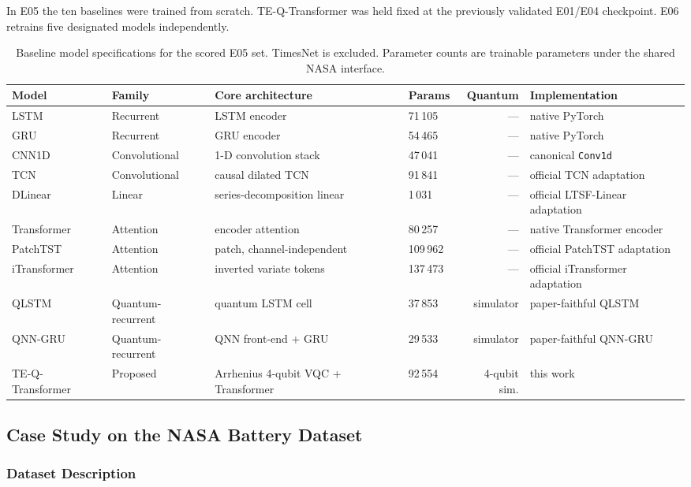 In E05 the ten baselines were trained from scratch. TE-Q-Transformer was held fixed at the previously validated E01/E04 checkpoint. E06 retrains five designated models independently.

\begin{table}[t]
\centering
\caption{Baseline model specifications for the scored E05 set. TimesNet is excluded. Parameter counts are trainable parameters under the shared NASA interface.}\label{tab:exp_baselines}
\footnotesize
\begin{tabular}{@{}llllrl@{}}
\toprule
Model & Family & Core architecture & Params & Quantum & Implementation \\
\midrule
LSTM & Recurrent & LSTM encoder & 71\,105 & --- & native PyTorch \\
GRU & Recurrent & GRU encoder & 54\,465 & --- & native PyTorch \\
CNN1D & Convolutional & 1-D convolution stack & 47\,041 & --- & canonical \texttt{Conv1d} \\
TCN & Convolutional & causal dilated TCN & 91\,841 & --- & official TCN adaptation \\
DLinear & Linear & series-decomposition linear & 1\,031 & --- & official LTSF-Linear adaptation \\
Transformer & Attention & encoder attention & 80\,257 & --- & native Transformer encoder \\
PatchTST & Attention & patch, channel-independent & 109\,962 & --- & official PatchTST adaptation \\
iTransformer & Attention & inverted variate tokens & 137\,473 & --- & official iTransformer adaptation \\
QLSTM & Quantum-recurrent & quantum LSTM cell & 37\,853 & simulator & paper-faithful QLSTM \\
QNN-GRU & Quantum-recurrent & QNN front-end + GRU & 29\,533 & simulator & paper-faithful QNN-GRU \\
TE-Q-Transformer & Proposed & Arrhenius 4-qubit VQC + Transformer & 92\,554 & 4-qubit sim. & this work \\
\bottomrule
\end{tabular}
\end{table}

\subsection{Case Study on the NASA Battery Dataset}
\label{sec:nasa_case}

\subsubsection{Dataset Description}
\label{sec:nasa_description}

